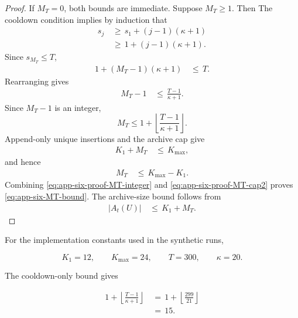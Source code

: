 \documentclass{article} %
\begin{document}
\begin{proof}
If \(M_T=0\), both bounds are immediate. Suppose \(M_T\ge1\). Then
The cooldown condition implies by induction that
\begin{align}
\label{eq:app-six-proof-sj-lower}
s_j
&\,\ge\,
s_1+(j-1)(\kappa+1)
\\
&\,\ge\,
1+(j-1)(\kappa+1).
\end{align}
Since \(s_{M_T}\le T\),
\begin{align}
\label{eq:app-six-proof-MT-cooldown}
1+(M_T-1)(\kappa+1)
&\,\le\,
T.
\end{align}
Rearranging gives
\begin{align}
\label{eq:app-six-proof-MT-floor}
M_T-1
&\,\le\,
\frac{T-1}{\kappa+1}.
\end{align}
Since $M_T-1$ is an integer,
\begin{equation}
\label{eq:app-six-proof-MT-integer}
M_T
\le
1+\left\lfloor\frac{T-1}{\kappa+1}\right\rfloor.
\end{equation}
Append-only unique insertions and the archive cap give
\begin{align}
\label{eq:app-six-proof-MT-cap}
K_1+M_T
&\,\le\,
K_{\max},
\end{align}
and hence
\begin{align}
\label{eq:app-six-proof-MT-cap2}
M_T
&\,\le\,
K_{\max}-K_1.
\end{align}
Combining \eqref{eq:app-six-proof-MT-integer} and \eqref{eq:app-six-proof-MT-cap2} proves \eqref{eq:app-six-MT-bound}.  The archive-size bound follows from
\begin{align}
\label{eq:app-six-proof-size-final}
|A_t(U)|
&\,\le\,
K_1+M_T.
\end{align}
\end{proof}

For the implementation constants used in the synthetic runs,

\begin{equation}
\label{eq:app-six-cooldown-example-constants}
K_1=12,
\qquad
K_{\max}=24,
\qquad
T=300,
\qquad
\kappa=20.
\end{equation}

The cooldown-only bound gives

\begin{align}
\label{eq:app-six-cooldown-example-cool}
1+\left\lfloor\frac{T-1}{\kappa+1}\right\rfloor
&\,=\,
1+\left\lfloor\frac{299}{21}\right\rfloor
\\
&\,=\,
15.
\end{align}
\end{document}
